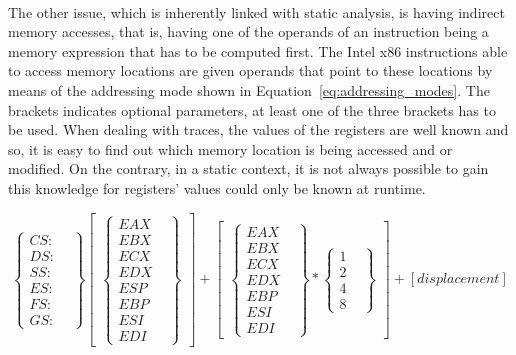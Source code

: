 \paragraph{}
The other issue, which is inherently linked with static analysis, is having indirect memory accesses, that is, having one of the operands of an instruction being a memory expression that has to be computed first. The Intel x86 instructions able to access memory locations are given operands that point to these locations by means of the addressing mode shown in Equation~\ref{eq:addressing_modes}. The brackets indicates optional parameters, at least one of the three brackets has to be used. When dealing with traces, the values of the registers are well known and so, it is easy to find out which memory location is being accessed and or modified. On the contrary, in a static context, it is not always possible to gain this knowledge for registers' values could only be known at runtime. 

\begin{equation} \label{eq:addressing_modes}
\begin{Bmatrix}
CS: & \\ 
DS: & \\ 
SS: & \\ 
ES: & \\ 
FS: & \\ 
GS:
\end{Bmatrix}
\begin{bmatrix} 
	\begin{Bmatrix} 
	EAX & \\ 
	EBX & \\ 
	ECX & \\ 
	EDX & \\ 
	ESP & \\ 
	EBP & \\ 
	ESI & \\ 
	EDI
	\end{Bmatrix}  
\end{bmatrix} + 
\begin{bmatrix} 
\begin{Bmatrix} 
EAX & \\ 
EBX & \\ 
ECX & \\ 
EDX & \\ 
EBP & \\ 
ESI & \\ 
EDI
\end{Bmatrix} *
\begin{Bmatrix} 
1&\\ 
2&\\ 
4&\\ 
8
\end{Bmatrix}
\end{bmatrix} + [displacement]
\end{equation}

